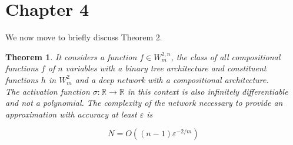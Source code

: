 \documentclass[11pt,a4paper]{article}
\theoremstyle{plain}
\newtheorem{theorem}{Theorem}[section]
\theoremstyle{definition}
\theoremstyle{remark}
\begin{document}

\setcounter{section}{3} 
\section{Chapter 4}

We now move to briefly discuss Theorem 2.

\setcounter{theorem}{1} 
\begin{theorem}
    It considers a function \( f \in W_{m}^{2,n} \), the class of all compositional functions \(f\) of \(n\) variables with a binary tree architecture and constituent functions \(h\)  in \(W_{m}^{2}\)  and a deep network with a compositional architecture.\\
The activation function \( \sigma: \mathbb{R} \rightarrow \mathbb{R} \) in this context is also infinitely differentiable and not a polynomial. The complexity of the network necessary to provide an approximation with accuracy at least \( \varepsilon \) is 

\[ N = O((n - 1)\varepsilon^{-2/m}) \]
\end{theorem}
\end{document}
